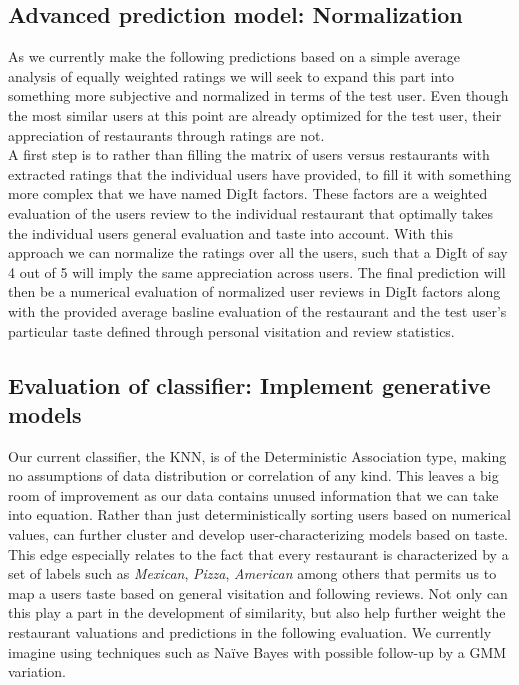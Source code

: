 \documentclass[10pt,twocolumn,letterpaper]{article}
\begin{document}
\subsection{Advanced prediction model: Normalization}
As we currently make the following predictions based on a simple average analysis of equally weighted ratings we will seek to expand this part into something more subjective and normalized in terms of the test user. Even though the most similar users at this point are already optimized for the test user, their appreciation of restaurants through ratings are not. \\[.5em]
\indent A first step is to rather than filling the matrix of users versus restaurants with extracted ratings that the individual users have provided, to fill it with something more complex that we have named DigIt factors. These factors are a weighted evaluation of the users review to the individual restaurant that optimally takes the individual users general evaluation and taste into account. With this approach we can normalize the ratings over all the users, such that a DigIt of say 4 out of 5 will imply the same appreciation across users. The final prediction will then be a numerical evaluation of normalized user reviews in DigIt factors along with the provided average basline evaluation of the restaurant and the test user's particular taste defined through personal visitation and review statistics.

\subsection{Evaluation of classifier: Implement generative models}
Our current classifier, the KNN, is of the Deterministic Association type, making no assumptions of data distribution or correlation of any kind. This leaves a big room of improvement as our data contains unused information that we can take into equation. Rather than just deterministically sorting users based on numerical values, can further cluster and develop user-characterizing models based on taste. This edge especially relates to the fact that every restaurant is characterized by a set of labels such as \textit{Mexican}, \textit{Pizza}, \textit{American} among others that permits us to map a users taste based on general visitation and following reviews. Not only can this play a part in the development of similarity, but also help further weight the restaurant valuations and predictions in the following evaluation. We currently imagine using techniques such as Naïve Bayes with possible follow-up by a GMM variation.
\end{document}

